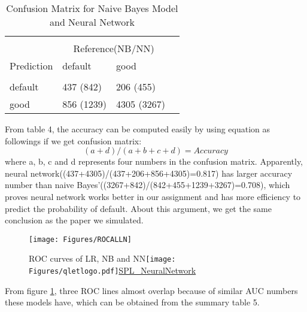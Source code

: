 \documentclass[a4paper,11pt]{article}
\begin{document}
\begin{center}
	\begin{table}[!ht]
		\centering  
		\begin{tabular}{l|llc}
			\hline\hline\\
			& \multicolumn{2}{c}{Reference(NB/NN)} \\		
			Prediction & default   &    good \\			
			\hline \\[-1.8ex] 			
			default & 437 (842)    &   206 (455) \\ 					
			good & 856 (1239)    &   4305  (3267)\\ 			
			\hline \hline			
		\end{tabular}  
		\caption{Confusion Matrix for Naive Bayes Model and Neural Network } 	
	\end{table}	
\end{center}
From table 4, the accuracy can be computed easily by using equation as followings if we get confusion matrix:
\begin{equation}
	\left ( a+d\right )/\left ( a+b+c+d \right )=Accuracy
\end{equation}
where a, b, c and d represents four numbers in the confusion matrix.
Apparently, neural network((437+4305)/(437+206+856+4305)=0.817) has larger accuracy number than naive Bayes’((3267+842)/(842+455+1239+3267)=0.708), which proves neural network works better in our assignment and has more efficiency to predict the probability of default. About this argument, we get the same conclusion as the paper we simulated. 

 \begin{figure}[!ht] 
	\centering\texttt{[image: Figures/ROCALLN]} 
	\caption{ROC curves of LR, NB and NN\protect\texttt{[image: Figures/qletlogo.pdf]}\href{https://github.com/Jingmin24/R-programming/blob/master/SPL_NeuralNetwork}{SPL\_NeuralNetwork}}\label{fig:ROCALLN} 
\end{figure}
From figure \ref{fig:ROCALLN}, three ROC lines almost overlap because of similar AUC numbers these models have, which can be obtained from the summary table 5.
\end{document}
